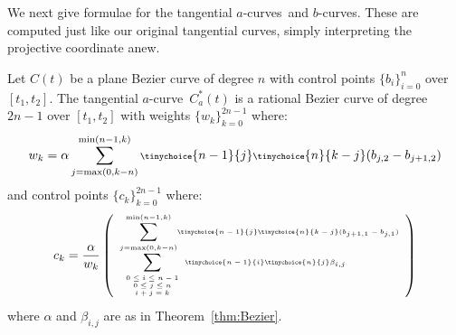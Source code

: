 \documentclass[9pt,twocolumn]{article}
\newcommand{\atang}{tangential $a$-curve\ }
\newcommand{\atangs}{tangential $a$-curves\ }
\begin{document}
We next give formulae for the \atangs and $b$-curves.
These are computed just like our original tangential curves,
simply interpreting the projective coordinate anew.
%
\begin{theorem}
\label{thm:rationalduala}
Let $C(t)$ be a plane Bezier curve of degree $n$ 
with control points $\{ b_i \}_{i=0}^n$ over $[t_1,t_2]$.
The \atang $C_a^*(t)$ is a rational Bezier curve of degree $2n-1$ 
over $[t_1,t_2]$ with weights $\{w_k\}_{k=0}^{2n-1}$ where: 
\begin{displaymath}
\scriptsize{
w_k = \alpha
\sum_{j=\mbox{max}(0,k-n)}^{\mbox{min}(n-1,k)} 
\tinychoice{n-1}{j} \tinychoice{n}{k-j} (b_{j,2} - b_{j+1,2})
}
\end{displaymath}
%
and control points $\{c_k\}_{k=0}^{2n-1}$ where:
\begin{displaymath}
\tiny{
c_k = \frac{\alpha}{w_k} 
\left(
\begin{array}{l}
	\displaystyle{\sum_{j=\mbox{\tiny{max}}(0,k-n)}^{\mbox{\tiny{min}}(n-1,k)}}
	\tinychoice{n-1}{j} \tinychoice{n}{k-j} (b_{j+1,1} - b_{j,1})\\
	\displaystyle{\sum_{\begin{array}{c} \mbox{\tiny{$0 \leq i \leq n-1$}} \\ 
			     \mbox{\tiny{$0 \leq j \leq n$}} \\ 
			     \mbox{\tiny{$i+j=k$}}
			     \end{array}}}
\tinychoice{n-1}{i} \tinychoice{n}{j} \beta_{i,j}
\end{array}
\right)
}
\end{displaymath}
where $\alpha$ and $\beta_{i,j}$ are as in Theorem~\ref{thm:Bezier}.
\end{theorem}
\end{document}
